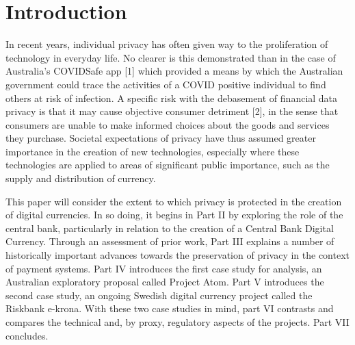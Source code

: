 \section{Introduction}

In recent years, individual privacy has often given way to the proliferation of technology in everyday life. No clearer is this demonstrated than in the case of Australia's COVIDSafe app [1] which provided a means by which the Australian government could trace the activities of a COVID positive individual to find others at risk of infection. A specific risk with the debasement of financial data privacy is that it may cause objective consumer detriment [2], in the sense that consumers are unable to make informed choices about the goods and services they purchase. Societal expectations of privacy have thus assumed greater importance in the creation of new technologies, especially where these technologies are applied to areas of significant public importance, such as the supply and distribution of currency.

This paper will consider the extent to which privacy is protected in the creation of digital currencies. In so doing, it begins in Part II by exploring the role of the central bank, particularly in relation to the creation of a Central Bank Digital Currency. Through an assessment of prior work, Part III explains a number of historically important advances towards the preservation of privacy in the context of payment systems. Part IV introduces the first case study for analysis, an Australian exploratory proposal called Project Atom. Part V introduces the second case study, an ongoing Swedish digital currency project called the Riskbank e-krona. With these two case studies in mind, part VI contrasts and compares the technical and, by proxy, regulatory aspects of the projects. Part VII concludes.
